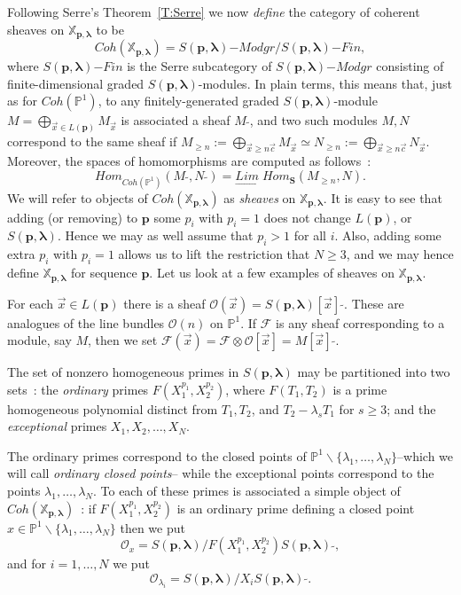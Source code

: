 \documentclass[a4paper,10pt]{amsart}
\def\O{\mathcal{O}}
\def\p{\mathbf{p}}
\def\xpl{\mathbb{X}_{\mathbf{p},\boldsymbol{\lambda}}}
\def\llambda{\boldsymbol{\lambda}}
\numberwithin{equation}{section}
\begin{document}
{\vspace{.1in}

Following Serre's Theorem~\ref{T:Serre} we now \textit{define} the category of coherent sheaves on $\xpl$ to be
$$Coh(\xpl)=S(\p,\llambda)\mathrm{-}Modgr/S(\p,\llambda)\mathrm{-}Fin,$$
where $S(\p,\llambda)\mathrm{-}Fin$ is the Serre subcategory of $S(\p,\llambda)\mathrm{-}Modgr$ consisting of finite-dimensional graded $S(\p,\llambda)$-modules. In plain terms, this means that, just as for $Coh(\mathbb{P}^1)$, to any finitely-generated graded $S(\p,\llambda)$-module $M=\bigoplus_{\vec{x} \in L(\p)} M_{\vec{x}}$ is associated a sheaf $M\;\widetilde{}$, and two such modules $M,N$ correspond to the same sheaf if $M_{\geq n}:=\bigoplus_{\vec{x} \geq n\vec{c}} M_{\vec{x}} \simeq N_{\geq n}:=\bigoplus_{\vec{x} \geq n\vec{c}} N_{\vec{x}}$. Moreover, the spaces of homomorphisms are computed as follows~:
\begin{equation}\label{E:defhomquotient2}
{Hom}_{Coh(\mathbb{P}^1)}(M\;\widetilde{}, N\;\widetilde{})=\underset{\longrightarrow} {{Lim}}\;{Hom}_{\mathbf{S}}(M_{\geq n},N).
\end{equation}
We will refer to objects of $Coh(\xpl)$ as \textit{sheaves} on $\xpl$. It is easy to see that adding (or removing) to $\p$ some $p_i$ with $p_i=1$ does not change $L(\p)$, or $S(\p,\llambda)$. Hence we may as well assume that $p_i >1$ for all $i$. Also, adding some extra $p_i$ with $p_i=1$ allows us to lift the restriction that $N \geq 3$, and we may hence define $\xpl$ for  sequence $\p$.
Let us look at a few examples of sheaves on $\xpl$.

\vspace{.15in}

For each $\vec{x} \in L(\p)$ there is a sheaf $\O(\vec{x})=S(\p,\llambda)[\vec{x}]\;\widetilde{}$. These are analogues of the line bundles $\O(n)$ on $\mathbb{P}^1$. If $\mathcal{F}$ is any sheaf corresponding to a module, say $M$, then we set $\mathcal{F}(\vec{x})=\mathcal{F}\otimes \O[\vec{x}]=M[\vec{x}]\;\widetilde{}$.

\vspace{.15in}

The set of nonzero homogeneous primes in $S(\p,\llambda)$ may be partitioned into two sets~: the \textit{ordinary} primes $F(X_1^{p_1},X_2^{p_2})$, where $F(T_1,T_2)$ is a prime homogeneous polynomial distinct from $T_1,T_2$, and $T_2-\lambda_s T_1$ for $s \geq 3$; and the \textit{exceptional} primes $X_1, X_2, \ldots, X_N$.

The ordinary primes correspond to the closed points of $\mathbb{P}^1 \backslash\{\lambda_1, \ldots, \lambda_N\}$--which we will call \textit{ordinary closed points}-- while the exceptional points correspond to the points $\lambda_1, \ldots, \lambda_N$.
To each of these primes is associated a simple object of $Coh(\xpl)$~: if $F(X_1^{p_1}, X_2^{p_2})$ is an ordinary prime defining a closed point $x \in \mathbb{P}^1\backslash\{\lambda_1, \ldots, \lambda_N\}$ then we put
$$\O_x=S(\p,\llambda)/F(X_1^{p_1},X_2^{p_2}) S(\p,\llambda)\;\widetilde{},$$
and for $i=1, \ldots, N$ we put
$$\O_{\lambda_i}=S(\p,\llambda)/X_i S(\p,\llambda)\;\widetilde{}.$$

}
\end{document}

